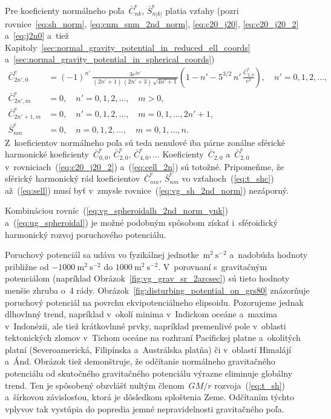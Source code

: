 \documentclass[a4paper, 12pt]{book}
\begin{document}
%
Pre koeficienty normálneho poľa~$\bar{C}_{nk}^{\mathrm{e}}$, 
$\bar{S}_{n|k|}^{\mathrm{e}}$ platia vzťahy (pozri rovnice~\ref{eq:sh_norm}, 
\ref{eq:cnm_snm_2nd_norm}, \ref{eq:c20_j20}, \ref{eq:c20_j20_2} a~\ref{eq:j2n0} 
a~tiež Kapitoly~\ref{sec:normal_gravity_potential_in_reduced_ell_coords} 
a~\ref{sec:normal_gravity_potential_in_spherical_coords})
%
\begin{align}
\label{eq:cell_2n}
\bar{C}^\mathrm{e}_{2n',0} &= (-1)^{n'} \, \frac{3e^{2n'}}{(2n' + 1) \, (2n' 
+ 3) \, \sqrt{4n' + 1}} \left( 1 - n' - 5^{3 \slash 2} \, n' \, 
\frac{\bar{C}^\mathrm{e}_{2,0}}{e^2} \right){,} \quad n' = 0, 1, 2,\dots{,}\\
%
\bar{C}^\mathrm{e}_{2n', m} &= 0{,} \quad n' = 0, 1, 2,\dots{,} \quad 
m > 0{,}\\
%
\bar{C}^\mathrm{e}_{2n' + 1, m} &= 0{,} \quad n' = 0, 1, 2,\dots{,} \quad 
m = 0, 1, \dots, 2n' + 1{,}\\
%
\label{eq:sell}
\bar{S}^\mathrm{e}_{nm} &= 0{,} \quad n = 0, 1, 2,\dots, \quad m = 0, 1, \dots, 
n{.}
\end{align}
%
Z~koeficientov normálneho poľa sú teda nenulové iba párne zonálne sférické 
harmonické koeficienty~$\bar{C}^{\mathrm{e}}_{0,0}$, 
$\bar{C}^{\mathrm{e}}_{2,0}$, $\bar{C}^{\mathrm{e}}_{4,0}, \dots 
$ Koeficienty~$\bar{C}_{2,0}$ a~$\bar{C}_{2,0}^\mathrm{e}$ 
v~rovniciach~(\ref{eq:c20_j20_2}) a~(\ref{eq:cell_2n}) sú totožné.  Pripomeňme, 
že sférický harmonický rád koeficientov~$\bar{C}_{nm}^{\mathrm{e}}$, 
$\bar{S}_{nm}^{\mathrm{e}}$ vo vzťahoch~(\ref{eq:t_shc}) až~(\ref{eq:sell}) 
musí byť v~zmysle rovnice~(\ref{eq:vg_sh_2nd_norm}) nezáporný.

Kombináciou rovníc~(\ref{eq:vg_spheroidalh_2nd_norm_ynk}) 
a~(\ref{eq:ug_spheroidal}) je možné podobným spôsobom získať i~sféroidický 
harmonický rozvoj poruchového potenciálu.

Poruchový potenciál sa udáva vo fyzikálnej jednotke~$\mathrm{m}^2 
\ \mathrm{s}^{-2}$ a~nadobúda hodnoty približne od $-1000\ \mathrm{m}^2 
\ \mathrm{s}^{-2}$ do $1000 \ \mathrm{m}^2 \ \mathrm{s}^{-2}$.  V~porovnaní 
s~gravitačným potenciálom (napríklad Obrázok~\ref{fig:vg_grav_sr_2arcsec}) sú 
tieto hodnoty menšie zhruba o~4 rády.  
Obrázok~\ref{fig:disturbing_potential_on_grs80} znázorňuje poruchový potenciál 
na povrchu ekvipotenciálneho elipsoidu.  Pozorujeme jednak dlhovlnný trend, 
napríklad v~okolí minima v~Indickom oceáne a~maxima v~Indonézii, ale tiež 
krátkovlnné prvky, napríklad premenlivé pole v~oblasti tektonických zlomov 
v~Tichom oceáne na rozhraní Pacifickej platne a~okolitých platní 
(Severoamerická, Filipínska a~Austrálska platňa) či v~oblastí Himalájí a~Ánd.  
Obrázok tiež demonštruje, že odčítanie normálneho gravitačného potenciálu od 
skutočného gravitačného potenciálu výrazne eliminuje globálny trend.  Ten je 
spôsobený obzvlášť nultým členom~$GM \slash r$ rozvoja~(\ref{eq:t_sh}) 
a~šírkovou závislosťou, ktorá je dôsledkom sploštenia Zeme.  Odčítaním týchto 
vplyvov tak vystúpia do popredia jemné nepravidelnosti gravitačného poľa.
\end{document}
